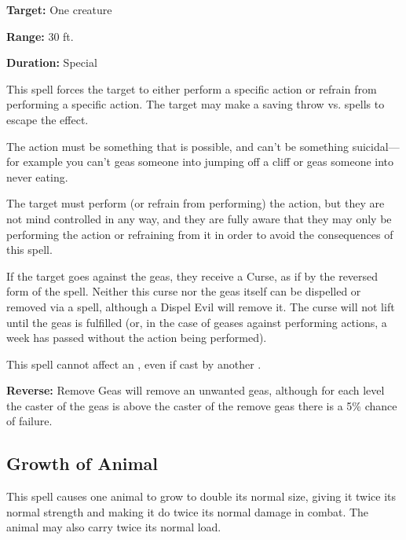 \begin{multicols*}{2}
{\textbf{Target:} One creature

\textbf{Range:} 30 ft.

\textbf{Duration:} Special}

This spell forces the target to either perform a specific action or refrain from performing a specific action. The target may make a saving throw vs. spells to escape the effect.

The action must be something that is possible, and can’t be something suicidal—for example you can’t geas someone into jumping off a cliff or geas someone into never eating.

The target must perform (or refrain from performing) the action, but they are not mind controlled in any way, and they are fully aware that they may only be performing the action or refraining from it in order to avoid the consequences of this spell.

If the target goes against the geas, they receive a Curse, as if by the reversed form of the  spell. Neither this curse nor the geas itself can be dispelled or removed via a  spell, although a Dispel Evil will remove it. The curse will not lift until the geas is fulfilled (or, in the case of geases against performing actions, a week has passed without the action being performed).

This spell cannot affect an , even if cast by another .

\textbf{Reverse:} \hypertarget{spell:Remove Geas}{Remove Geas} will remove an unwanted geas, although for each level the caster of the geas is above the caster of the remove geas there is a 5\% chance of failure.

\subsection{Growth of Animal}\label{spell:Growth of Animal}

This spell causes one animal to grow to double its normal size, giving it twice its normal strength and making it do twice its normal damage in combat. The animal may also carry twice its normal load.


\end{multicols*}
